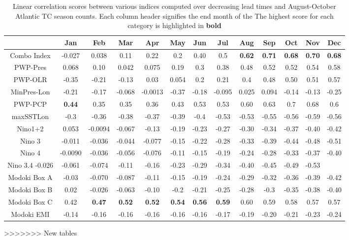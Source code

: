 \documentclass[]{article}
\begin{document}
\begin{table}
\begin{tabular}{ccccccccccccc}
\hline
& Jan & Feb & Mar & Apr & May & Jun & Jul & Aug & Sep & Oct & Nov & Dec\\
\hline
Combo Index & -0.027 & 0.038 & 0.11 & 0.22 & 0.2 & 0.40 & 0.5 & \textbf{0.62} & \textbf{0.71} & \textbf{0.68} & \textbf{0.70} & \textbf{0.68}\\
PWP-Pres &0.068 & 0.10 & 0.042 & 0.075 & 0.19 & 0.3 & 0.38 & 0.48 & 0.52 & 0.52 & 0.54 & 0.58\\
PWP-OLR   & -0.35 & -0.21 & -0.13 & 0.03 & 0.054 & 0.2 & 0.21 & 0.4 & 0.48 & 0.50 & 0.51 & 0.57\\
MinPres-Lon & -0.21 & -0.17 & -0.068 & -0.0013 & -0.37 & -0.18 & -0.095 & 0.025 & 0.094 & -0.14 & -0.13 & -0.25\\
PWP-PCP  & \textbf{0.44} & 0.35 & 0.35 & 0.36 & 0.43 & 0.53 & 0.53 & 0.60 & 0.63 & 0.7 & 0.68 & 0.6\\
maxSSTLon & -0.3 & -0.36 & -0.38 & -0.37 & -0.39 & -0.4 & -0.53 & -0.53 & -0.55 & -0.56 & -0.59 & -0.56\\
Nino1+2  & 0.053 & -0.0094 & -0.067 & -0.13 & -0.19 & -0.23 & -0.27 & -0.30 & -0.34 & -0.37 & -0.40 & -0.42\\
Nino 3 & -0.011 & -0.036 & -0.044 & -0.077 & -0.15 & -0.22 & -0.28 & -0.33 & -0.39 & -0.44 & -0.48 & -0.51\\
Nino 4 & -0.0090 & -0.036 & -0.056 & -0.076 & -0.11 & -0.15 & -0.19 & -0.24 & -0.28 & -0.33 & -0.37 & -0.40\\
Nino 3.4  -0.026 & -0.061 & -0.074 & -0.11 & -0.16 & -0.23 & -0.29 & -0.34 & -0.40 & -0.45 & -0.49 & -0.53\\
Modoki Box A  & -0.03 & -0.070 & -0.087 & -0.11 & -0.15 & -0.19 & -0.24 & -0.29 & -0.32 & -0.36 & -0.39 & -0.42\\
Modoki Box B & 0.02 & -0.026 & -0.063 & -0.10 & -0.2 & -0.21 & -0.25 & -0.28 & -0.3 & -0.35 & -0.38 & -0.40\\
Modoki Box C & 0.42 & \textbf{0.47} & \textbf{0.52} & \textbf{0.52} & \textbf{0.54} & \textbf{0.56} & \textbf{0.59} & 0.60 & 0.59 & 0.58 & 0.57 & 0.57\\
Modoki EMI & -0.14 & -0.16 & -0.16 & -0.16 & -0.16 & -0.16 & -0.17 & -0.19 & -0.20 & -0.21 & -0.23 & -0.24\\
\hline
\end{tabular}
\caption{Linear correlation scores between various indices computed over decreasing lead times and August-October Atlantic TC season counts. Each column header signifies the end month of the The highest score for each category is highlighted in \textbf{bold}}
\label{ref:lead_tc}
\end{table}
>>>>>>> New tables
\end{document}
